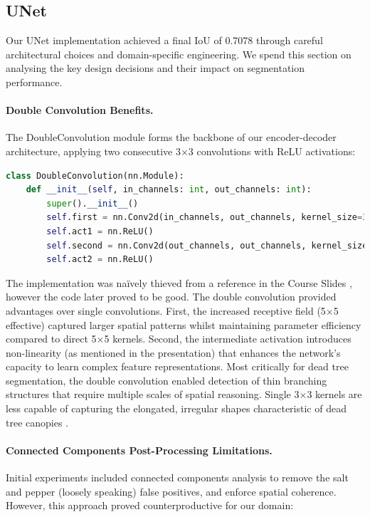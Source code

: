 \subsection{UNet}
\label{sec:aj_unet_discussion}

Our UNet implementation achieved a final IoU of 0.7078 through careful architectural choices and domain-specific engineering. We spend this section on analysing the key design decisions and their impact on segmentation performance.

\paragraph{Double Convolution Benefits.}
The DoubleConvolution module forms the backbone of our encoder-decoder architecture, applying two consecutive 3×3 convolutions with ReLU activations:

\begin{lstlisting}[language=Python]
class DoubleConvolution(nn.Module):
    def __init__(self, in_channels: int, out_channels: int):
        super().__init__()
        self.first = nn.Conv2d(in_channels, out_channels, kernel_size=3, padding=1)
        self.act1 = nn.ReLU()
        self.second = nn.Conv2d(out_channels, out_channels, kernel_size=3, padding=1)
        self.act2 = nn.ReLU()
\end{lstlisting}

The implementation was naïvely thieved from a reference in the Course Slides \cite{b19}, however the code later proved to be good. The double convolution provided advantages over single convolutions. First, the increased receptive field (5×5 effective) captured larger spatial patterns whilst maintaining parameter efficiency compared to direct 5×5 kernels. Second, the intermediate activation introduces non-linearity (as mentioned in the presentation) that enhances the network's capacity to learn complex feature representations. Most critically for dead tree segmentation, the double convolution enabled detection of thin branching structures that require multiple scales of spatial reasoning. Single 3×3 kernels are less capable of capturing the elongated, irregular shapes characteristic of dead tree canopies \cite{b20}.

\paragraph{Connected Components Post-Processing Limitations.}
Initial experiments included connected components analysis to remove the salt and pepper (loosely speaking) false positives, and enforce spatial coherence. However, this approach proved counterproductive for our domain:

